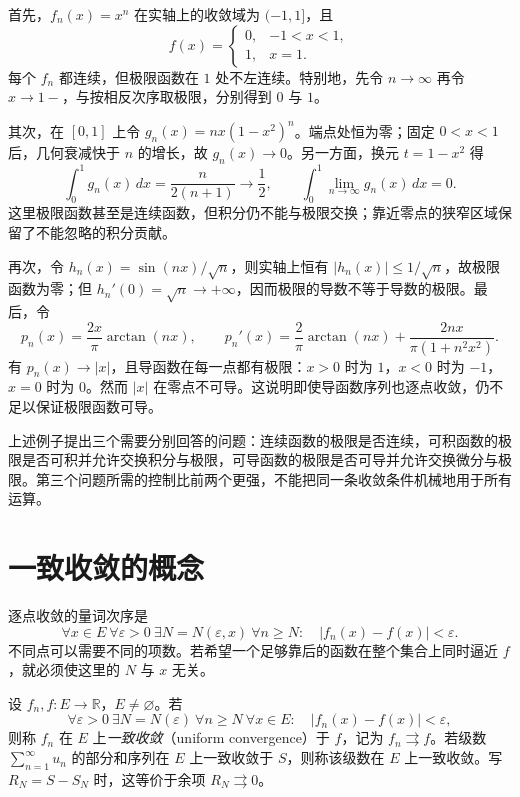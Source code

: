 \documentclass[UTF8,12pt,a4paper,fontset=fandol]{ctexbook}
\begin{document}
\begin{solve}
首先，$f_n(x)=x^n$ 在实轴上的收敛域为 $(-1,1]$，且
\[
    f(x)=\begin{cases}0,&-1<x<1,\\1,&x=1.\end{cases}
\]
每个 $f_n$ 都连续，但极限函数在 $1$ 处不左连续。特别地，先令 $n\to\infty$ 再令 $x\to1-$，与按相反次序取极限，分别得到 $0$ 与 $1$。

其次，在 $[0,1]$ 上令 $g_n(x)=nx(1-x^2)^n$。端点处恒为零；固定 $0<x<1$ 后，几何衰减快于 $n$ 的增长，故 $g_n(x)\to0$。另一方面，换元 $t=1-x^2$ 得
\[
    \int_0^1g_n(x)\,dx=\frac{n}{2(n+1)}\longrightarrow\frac12,
    \qquad \int_0^1\lim_{n\to\infty}g_n(x)\,dx=0.
\]
这里极限函数甚至是连续函数，但积分仍不能与极限交换；靠近零点的狭窄区域保留了不能忽略的积分贡献。

再次，令 $h_n(x)=\sin(nx)/\sqrt n$，则实轴上恒有 $|h_n(x)|\leq1/\sqrt n$，故极限函数为零；但 $h_n'(0)=\sqrt n\to+\infty$，因而极限的导数不等于导数的极限。最后，令
\[
    p_n(x)=\frac{2x}{\pi}\arctan(nx),\qquad
    p_n'(x)=\frac2\pi\arctan(nx)+\frac{2nx}{\pi(1+n^2x^2)}.
\]
有 $p_n(x)\to|x|$，且导函数在每一点都有极限：$x>0$ 时为 $1$，$x<0$ 时为 $-1$，$x=0$ 时为 $0$。然而 $|x|$ 在零点不可导。这说明即使导函数序列也逐点收敛，仍不足以保证极限函数可导。
\end{solve}

上述例子提出三个需要分别回答的问题：连续函数的极限是否连续，可积函数的极限是否可积并允许交换积分与极限，可导函数的极限是否可导并允许交换微分与极限。第三个问题所需的控制比前两个更强，不能把同一条收敛条件机械地用于所有运算。

\section{一致收敛的概念}
\label{sec:concept-of-uniform-convergence}

逐点收敛的量词次序是
\[
    \forall x\in E\ \forall\varepsilon>0\ \exists N=N(\varepsilon,x)
    \ \forall n\geq N:\quad |f_n(x)-f(x)|<\varepsilon.
\]
不同点可以需要不同的项数。若希望一个足够靠后的函数在整个集合上同时逼近 $f$，就必须使这里的 $N$ 与 $x$ 无关。

\begin{definition}
\label{def:uniform-function-sequence-and-series-convergence}
设 $f_n,f:E\to\mathbb R$，$E\neq\varnothing$。若
\begin{equation}
    \forall\varepsilon>0\ \exists N=N(\varepsilon)\ \forall n\geq N
    \ \forall x\in E:\quad |f_n(x)-f(x)|<\varepsilon,
    \label{eq:uniform-function-sequence-convergence}
\end{equation}
则称 $f_n$ 在 $E$ 上\emph{一致收敛}（uniform convergence）于 $f$，记为 $f_n\rightrightarrows f$。若级数 $\sum_{n=1}^\infty u_n$ 的部分和序列在 $E$ 上一致收敛于 $S$，则称该级数在 $E$ 上一致收敛。写 $R_N=S-S_N$ 时，这等价于余项 $R_N\rightrightarrows0$。
\end{definition}
\end{document}
